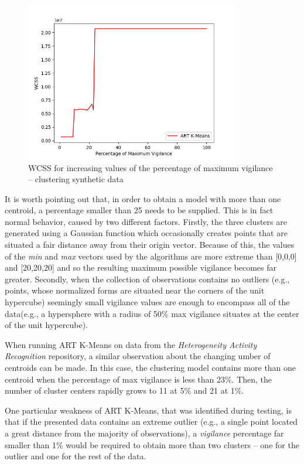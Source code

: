 \documentclass{l4proj}
\begin{document}
\begin{figure}[H]
	\centering
    \label{fig:res12}
    \includegraphics[width=0.83\textwidth]{images/result12}
    \caption{WCSS for increasing values of the percentage of maximum vigilance -- clustering synthetic data} 
\end{figure}

It is worth pointing out that, in order to obtain a model with more than one centroid, a percentage smaller than 25 needs to be supplied. This is in fact normal behavior, caused by two different factors. Firstly, the three clusters are generated using a Gaussian function which occasionally creates points that are situated a fair distance away from their origin vector. Because of this, the values of the \textit{min} and \textit{max} vectors used by the algorithms are more extreme than [0,0,0] and [20,20,20] and so the resulting maximum possible vigilance becomes far greater. Secondly, when the collection of observations contains no outliers (e.g., points, whose normalized forms are situated near the corners of the unit hypercube) seemingly small vigilance values are enough to encompass all of the data(e.g., a hypersphere with a radius of 50\% max vigilance situates at the center of the unit hypercube).


When running ART K-Means on data from the \textit{Heterogeneity Activity Recognition} repository, a similar observation about the changing umber of centroids can be made. In this case, the clustering model contains more than one centroid when the percentage of max vigilance is less than 23\%. Then, the number of cluster centers rapidly grows to 11 at 5\% and 21 at 1\%.

One particular weakness of ART K-Means, that was identified during testing, is that
if the presented data contains an extreme outlier (e.g., a single point located a great distance from the majority of observations), a \textit{vigilance} percentage far smaller than 1\% would be required to obtain more than two clusters -- one for the outlier and one for the rest of the data. 
\end{document}

